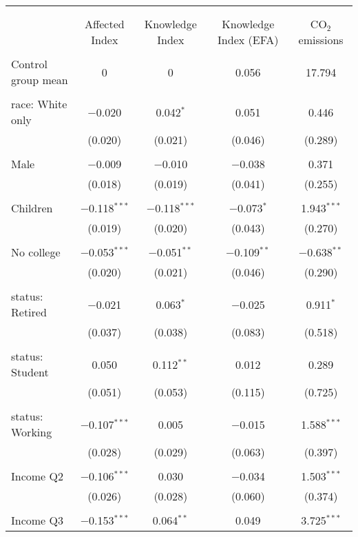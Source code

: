
\begin{tabular}{@{\extracolsep{5pt}}lcccc} 
\\[-1.8ex]\hline 
\hline \\[-1.8ex] 
\\[-1.8ex] & Affected Index & Knowledge Index & Knowledge Index (EFA) & CO$_{2}$ emissions \\ 
\hline \\[-1.8ex] 
 Control group mean & 0 & 0 & 0.056 & 17.794  \\ \hline \\[-1.8ex] race: White only & $-$0.020 & 0.042$^{*}$ & 0.051 & 0.446 \\ 
  & (0.020) & (0.021) & (0.046) & (0.289) \\ 
  & & & & \\ 
 Male & $-$0.009 & $-$0.010 & $-$0.038 & 0.371 \\ 
  & (0.018) & (0.019) & (0.041) & (0.255) \\ 
  & & & & \\ 
 Children & $-$0.118$^{***}$ & $-$0.118$^{***}$ & $-$0.073$^{*}$ & 1.943$^{***}$ \\ 
  & (0.019) & (0.020) & (0.043) & (0.270) \\ 
  & & & & \\ 
 No college & $-$0.053$^{***}$ & $-$0.051$^{**}$ & $-$0.109$^{**}$ & $-$0.638$^{**}$ \\ 
  & (0.020) & (0.021) & (0.046) & (0.290) \\ 
  & & & & \\ 
 status: Retired & $-$0.021 & 0.063$^{*}$ & $-$0.025 & 0.911$^{*}$ \\ 
  & (0.037) & (0.038) & (0.083) & (0.518) \\ 
  & & & & \\ 
 status: Student & 0.050 & 0.112$^{**}$ & 0.012 & 0.289 \\ 
  & (0.051) & (0.053) & (0.115) & (0.725) \\ 
  & & & & \\ 
 status: Working & $-$0.107$^{***}$ & 0.005 & $-$0.015 & 1.588$^{***}$ \\ 
  & (0.028) & (0.029) & (0.063) & (0.397) \\ 
  & & & & \\ 
 Income Q2 & $-$0.106$^{***}$ & 0.030 & $-$0.034 & 1.503$^{***}$ \\ 
  & (0.026) & (0.028) & (0.060) & (0.374) \\ 
  & & & & \\ 
 Income Q3 & $-$0.153$^{***}$ & 0.064$^{**}$ & 0.049 & 3.725$^{***}$ \\ 

\end{tabular}
